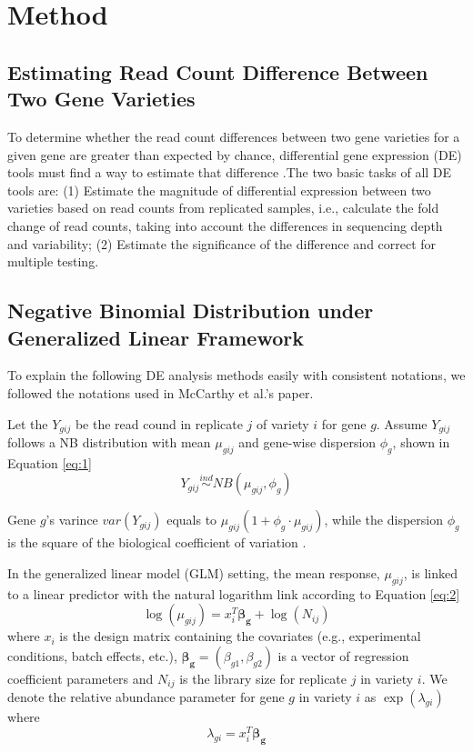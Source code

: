 \chapter{Method}

\section{Estimating Read Count Difference Between Two Gene Varieties}

To determine whether the read count differences between two gene varieties for a given gene are greater than expected by chance, differential gene expression (DE) tools must find a way to estimate that difference \citep{dundar2015introduction}.The two basic tasks of all DE tools are: (1) Estimate the magnitude of differential expression between two varieties based on read counts from replicated samples, i.e., calculate the fold change of read counts, taking into account the differences in sequencing depth and variability; (2) Estimate the significance of the difference and correct for multiple testing. 

\section{Negative Binomial Distribution under Generalized Linear Framework}

To explain the following DE analysis methods easily with consistent notations, we followed the notations used in McCarthy et al.'s paper\citep{mccarthy2012differential}.

Let the $Y_{gij}$ be the read cound in replicate $j$ of variety $i$ for gene $g$. Assume $Y_{gij}$ follows a NB distribution with mean $\mu_{gij}$ and gene-wise dispersion $\phi_g$, shown in Equation \eqref{eq:1}
\begin{equation}
\label{eq:1}
Y_{gij} \stackrel{ind}{\sim} NB(\mu_{gij}, \phi_g)
\end{equation}

Gene $g$'s varince $var(Y_{gij})$ equals to $\mu_{gij}(1+\phi_g \cdot \mu_{gij})$, while the dispersion $\phi_g$ is the square of the biological coefficient of variation \citep{mccarthy2012differential}. 

In the generalized linear model (GLM) setting, the mean response, $\mu_{gij}$, is linked to a  linear predictor with the natural logarithm link according to Equation \eqref{eq:2}
\begin{equation}
\label{eq:2}
\log(\mu_{gij}) = x_{i}^T\mathbf{\beta_g} + \log(N_{ij})
\end{equation}
where $x_{i}$ is the design matrix containing the covariates (e.g., experimental conditions, batch effects, etc.), $\mathbf{\beta_g} = (\beta_{g1}, \beta_{g2})$ is a vector of regression coefficient parameters and $N_{ij}$ is the library size for replicate $j$ in variety $i$. We denote the relative abundance parameter for gene $g$ in variety $i$ as $\exp(\lambda_{gi})$ where
\begin{equation}
\label{eq:3}
\lambda_{gi} = x_i ^T \mathbf{\beta_g}
\end{equation}

